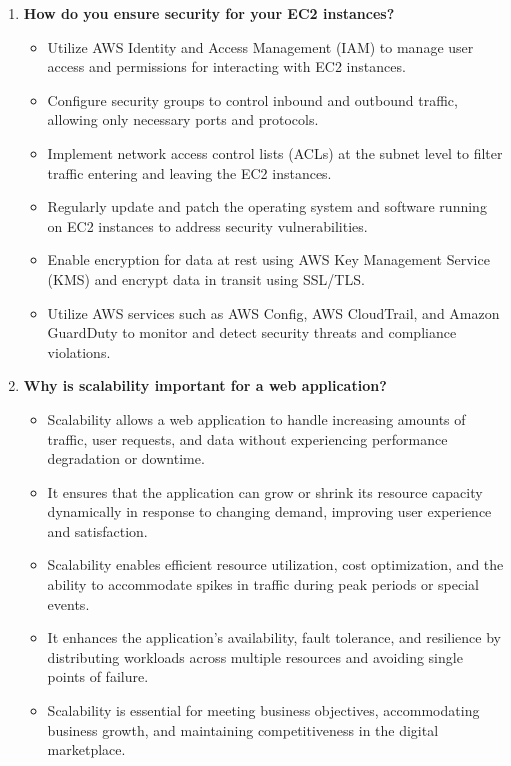 \documentclass[11pt]{article}
\begin{document}
\begin{enumerate}
    \item \textbf{How do you ensure security for your EC2 instances?}
          \begin{itemize}
              \item Utilize AWS Identity and Access Management (IAM) to manage user access and permissions for interacting with EC2 instances.
              \item Configure security groups to control inbound and outbound traffic, allowing only necessary ports and protocols.
              \item Implement network access control lists (ACLs) at the subnet level to filter traffic entering and leaving the EC2 instances.
              \item Regularly update and patch the operating system and software running on EC2 instances to address security vulnerabilities.
              \item Enable encryption for data at rest using AWS Key Management Service (KMS) and encrypt data in transit using SSL/TLS.
              \item Utilize AWS services such as AWS Config, AWS CloudTrail, and Amazon GuardDuty to monitor and detect security threats and compliance violations.
          \end{itemize}

    \item \textbf{Why is scalability important for a web application?}
          \begin{itemize}
              \item Scalability allows a web application to handle increasing amounts of traffic, user requests, and data without experiencing performance degradation or downtime.
              \item It ensures that the application can grow or shrink its resource capacity dynamically in response to changing demand, improving user experience and satisfaction.
              \item Scalability enables efficient resource utilization, cost optimization, and the ability to accommodate spikes in traffic during peak periods or special events.
              \item It enhances the application's availability, fault tolerance, and resilience by distributing workloads across multiple resources and avoiding single points of failure.
              \item Scalability is essential for meeting business objectives, accommodating business growth, and maintaining competitiveness in the digital marketplace.
          \end{itemize}


\end{enumerate}
\end{document}
